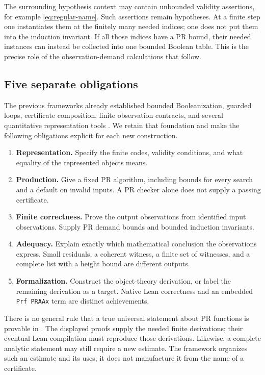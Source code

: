 The surrounding hypothesis context may contain unbounded validity
assertions, for example \eqref{eq:regular-name}. Such assertions remain
hypotheses. At a finite step one instantiates them at the finitely many
needed indices; one does not put them into the induction invariant.
If all those indices have a PR bound, their needed instances can instead
be collected into one bounded Boolean table. This is the precise role of
the observation-demand calculations that follow.

\subsection{Five separate obligations}

The previous frameworks already established bounded Booleanization,
guarded loops, certificate composition, finite observation contracts,
and several quantitative representation tools
\cite{repo-contracts,repo-embedding,repo-first-framework}. We retain that
foundation and make the following obligations explicit for each new
construction.
\begin{enumerate}
\item \textbf{Representation.} Specify the finite codes, validity
conditions, and what equality of the represented objects means.
\item \textbf{Production.} Give a fixed PR algorithm, including bounds
for every search and a default on invalid inputs. A PR checker alone
does not supply a passing certificate.
\item \textbf{Finite correctness.} Prove the output observations from
identified input observations. Supply PR demand bounds and bounded
induction invariants.
\item \textbf{Adequacy.} Explain exactly which mathematical conclusion
the observations express. Small residuals, a coherent witness, a finite
set of witnesses, and a complete list with a height bound are different
outputs.
\item \textbf{Formalization.} Construct the object-theory derivation,
or label the remaining derivation as a target. Native Lean correctness
and an embedded \texttt{Prf PRAAx} term are distinct achievements.
\end{enumerate}

There is no general rule that a true universal statement about PR
functions is provable in \ipra. The displayed proofs supply the needed
finite derivations; their eventual Lean compilation must reproduce
those derivations. Likewise, a complete analytic statement may still
require a new estimate. The framework organizes such an estimate and
its uses; it does not manufacture it from the name of a certificate.

